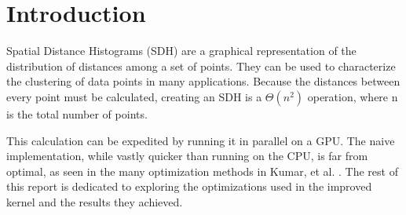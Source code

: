 	\section{Introduction}
	\hspace{\parindent}Spatial Distance Histograms (SDH) are a graphical representation of the distribution of distances among a set of points. They can be used to characterize the clustering of data points in many applications. Because the distances between every point must be calculated, creating an SDH is a $\Theta(n^2)$ operation, where n is the total number of points.
	
	This calculation can be expedited by running it in parallel on a GPU. The naive implementation, while vastly quicker than running on the CPU, is far from optimal, as seen in the many optimization methods in Kumar, et al. \cite{6702476}. The rest of this report is dedicated to exploring the optimizations used in the improved kernel and the results they achieved.%